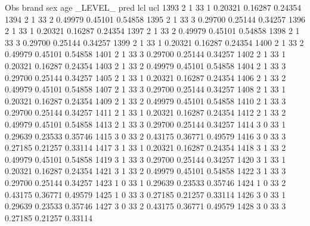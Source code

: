 \documentclass{article}
\begin{document}
\begin{Woutput}
 Obs    brand    sex    age    _LEVEL_      pred       lcl        ucl
1393      2       1      33       1       0.20321    0.16287    0.24354
1394      2       1      33       2       0.49979    0.45101    0.54858
1395      2       1      33       3       0.29700    0.25144    0.34257
1396      2       1      33       1       0.20321    0.16287    0.24354
1397      2       1      33       2       0.49979    0.45101    0.54858
1398      2       1      33       3       0.29700    0.25144    0.34257
1399      2       1      33       1       0.20321    0.16287    0.24354
1400      2       1      33       2       0.49979    0.45101    0.54858
1401      2       1      33       3       0.29700    0.25144    0.34257
1402      2       1      33       1       0.20321    0.16287    0.24354
1403      2       1      33       2       0.49979    0.45101    0.54858
1404      2       1      33       3       0.29700    0.25144    0.34257
1405      2       1      33       1       0.20321    0.16287    0.24354
1406      2       1      33       2       0.49979    0.45101    0.54858
1407      2       1      33       3       0.29700    0.25144    0.34257
1408      2       1      33       1       0.20321    0.16287    0.24354
1409      2       1      33       2       0.49979    0.45101    0.54858
1410      2       1      33       3       0.29700    0.25144    0.34257
1411      2       1      33       1       0.20321    0.16287    0.24354
1412      2       1      33       2       0.49979    0.45101    0.54858
1413      2       1      33       3       0.29700    0.25144    0.34257
1414      3       0      33       1       0.29639    0.23533    0.35746
1415      3       0      33       2       0.43175    0.36771    0.49579
1416      3       0      33       3       0.27185    0.21257    0.33114
1417      3       1      33       1       0.20321    0.16287    0.24354
1418      3       1      33       2       0.49979    0.45101    0.54858
1419      3       1      33       3       0.29700    0.25144    0.34257
1420      3       1      33       1       0.20321    0.16287    0.24354
1421      3       1      33       2       0.49979    0.45101    0.54858
1422      3       1      33       3       0.29700    0.25144    0.34257
1423      1       0      33       1       0.29639    0.23533    0.35746
1424      1       0      33       2       0.43175    0.36771    0.49579
1425      1       0      33       3       0.27185    0.21257    0.33114
1426      3       0      33       1       0.29639    0.23533    0.35746
1427      3       0      33       2       0.43175    0.36771    0.49579
1428      3       0      33       3       0.27185    0.21257    0.33114

\end{Woutput}
\end{document}
